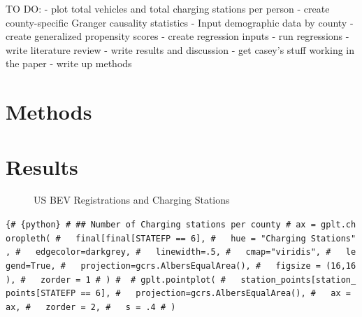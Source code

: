 \documentclass[
  letterpaper,
  DIV=11,
  numbers=noendperiod]{scrartcl}
\begin{document}
TO DO: - plot total vehicles and total charging stations per person -
create county-specific Granger causality statistics - Input demographic
data by county - create generalized propensity scores - create
regression inputs - run regressions - write literature review - write
results and discussion - get casey's stuff working in the paper - write
up methods

\hypertarget{methods}{%
\section{Methods}\label{methods}}

\hypertarget{results}{%
\section{Results}\label{results}}

\begin{figure}

\begin{minipage}[t]{\linewidth}

{\centering 


\caption{US BEV Registrations and Charging Stations}

}

\end{minipage}%

\end{figure}

\texttt{\{\#\ \{python\}\ \#\ \#\#\ Number\ of\ Charging\ stations\ per\ county\ \#\ ax\ =\ gplt.choropleth(\ \#\ \ \ final{[}final{[}\textquotesingle{}STATEFP\textquotesingle{}{]}\ ==\ 6{]},\ \#\ \ \ hue\ =\ "Charging\ Stations",\ \#\ \ \ edgecolor=\textquotesingle{}darkgrey\textquotesingle{},\ \#\ \ \ linewidth=.5,\ \#\ \ \ cmap="viridis",\ \#\ \ \ legend=True,\ \#\ \ \ projection=gcrs.AlbersEqualArea(),\ \#\ \ \ figsize\ =\ (16,16),\ \#\ \ \ zorder\ =\ 1\ \#\ )\ \#\ \ \#\ gplt.pointplot(\ \#\ \ \ station\_points{[}station\_points{[}\textquotesingle{}STATEFP\textquotesingle{}{]}\ ==\ 6{]},\ \#\ \ \ projection=gcrs.AlbersEqualArea(),\ \#\ \ \ ax\ =\ ax,\ \#\ \ \ zorder\ =\ 2,\ \#\ \ \ s\ =\ .4\ \#\ )}
\end{document}
